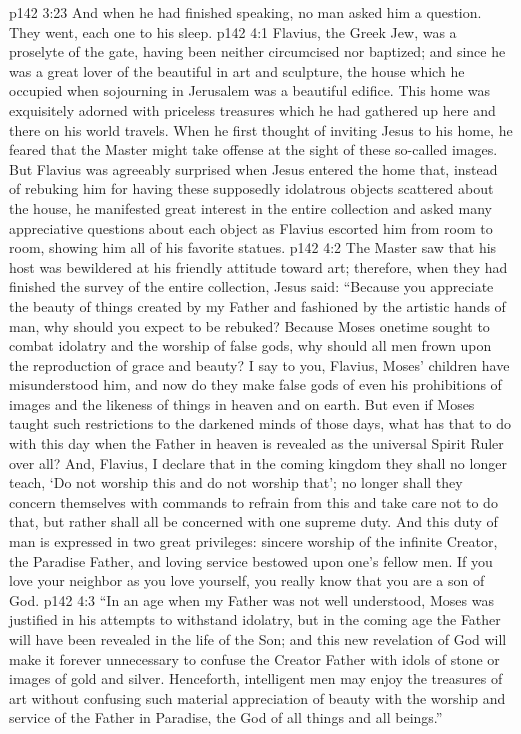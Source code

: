 \vs p142 3:23 \pc And when he had finished speaking, no man asked him a question. They went, each one to his sleep.
\vs p142 4:1 Flavius, the Greek Jew, was a proselyte of the gate, having been neither circumcised nor baptized; and since he was a great lover of the beautiful in art and sculpture, the house which he occupied when sojourning in Jerusalem was a beautiful edifice. This home was exquisitely adorned with priceless treasures which he had gathered up here and there on his world travels. When he first thought of inviting Jesus to his home, he feared that the Master might take offense at the sight of these so\hyp{}called images. But Flavius was agreeably surprised when Jesus entered the home that, instead of rebuking him for having these supposedly idolatrous objects scattered about the house, he manifested great interest in the entire collection and asked many appreciative questions about each object as Flavius escorted him from room to room, showing him all of his favorite statues.
\vs p142 4:2 The Master saw that his host was bewildered at his friendly attitude toward art; therefore, when they had finished the survey of the entire collection, Jesus said: \textcolor{ubdarkred}{“Because you appreciate the beauty of things created by my Father and fashioned by the artistic hands of man, why should you expect to be rebuked? Because Moses onetime sought to combat idolatry and the worship of false gods, why should all men frown upon the reproduction of grace and beauty? I say to you, Flavius, Moses’ children have misunderstood him, and now do they make false gods of even his prohibitions of images and the likeness of things in heaven and on earth. But even if Moses taught such restrictions to the darkened minds of those days, what has that to do with this day when the Father in heaven is revealed as the universal Spirit Ruler over all? And, Flavius, I declare that in the coming kingdom they shall no longer teach, ‘Do not worship this and do not worship that’; no longer shall they concern themselves with commands to refrain from this and take care not to do that, but rather shall all be concerned with one supreme duty. And this duty of man is expressed in two great privileges: sincere worship of the infinite Creator, the Paradise Father, and loving service bestowed upon one’s fellow men. If you love your neighbor as you love yourself, you really know that you are a son of God.}
\vs p142 4:3 \textcolor{ubdarkred}{“In an age when my Father was not well understood, Moses was justified in his attempts to withstand idolatry, but in the coming age the Father will have been revealed in the life of the Son; and this new revelation of God will make it forever unnecessary to confuse the Creator Father with idols of stone or images of gold and silver. Henceforth, intelligent men may enjoy the treasures of art without confusing such material appreciation of beauty with the worship and service of the Father in Paradise, the God of all things and all beings.”}
